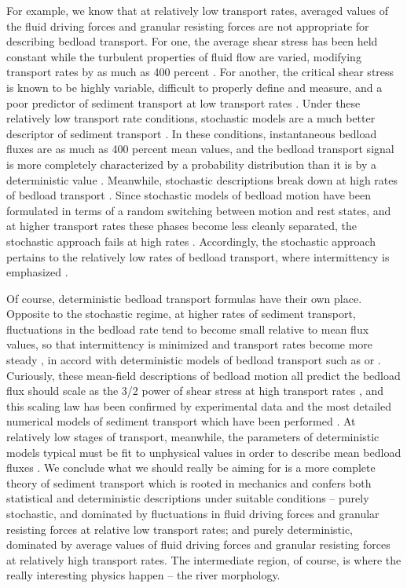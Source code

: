 \documentclass{article}
\begin{document}
For example, we know that at relatively low transport rates, averaged values of the fluid driving forces and granular resisting forces are not appropriate for describing bedload transport. 
For one, the average shear stress has been held constant while the turbulent properties of fluid flow are varied, modifying transport rates by as much as 400 percent \citep{Sumer2003}. 
For another, the critical shear stress is known to be highly variable, difficult to properly define and measure, and a poor predictor of sediment transport at low transport rates \citep{Paintal1969, Kirchener1990, Montgomery1997, Wilcock2008}. 
Under these relatively low transport rate conditions, stochastic models are a much better descriptor of sediment transport \citep{Yalin1972, Ancey2006, Furbish2012}. 
In these conditions, instantaneous bedload fluxes are as much as 400 percent mean values, and the bedload transport signal is more completely characterized by a probability distribution than it is by a deterministic value \citep{Bohm2004, Singh2009}. 
Meanwhile, stochastic descriptions break down at high rates of bedload transport \citep{Yalin1972}. 
Since stochastic models of bedload motion have been formulated in terms of a random switching between motion and rest states, and at higher transport rates these phases become less cleanly separated, the stochastic approach fails at high rates \citep{Heyman2013}.
Accordingly, the stochastic approach pertains to the relatively low rates of bedload transport, where intermittency is emphasized \citep{Ancey2008}.  

Of course, deterministic bedload transport formulas have their own place. 
Opposite to the stochastic regime, at higher rates of sediment transport, fluctuations in the bedload rate tend to become small relative to mean flux values, so that intermittency is minimized and transport rates become more steady \citep{Ancey2008}, in accord with deterministic models of bedload transport such as \citet{Meyer-Peter1948} or \citet{Bagnold1966}.  
Curiously, these mean-field descriptions of bedload motion all predict the bedload flux should scale as the 3/2 power of shear stress at high transport rates \citep{Yalin1972}, and this scaling law has been confirmed by experimental data \citep{Gomez1989, Recking2007, Wong2007} and the most detailed numerical models of sediment transport which have been performed \citep{Elghannay2017}. 
At relatively low stages of transport, meanwhile, the parameters of deterministic models typical must be fit to unphysical values in order to describe mean bedload fluxes \citep{}. 
We conclude what we should really be aiming for is a more complete theory of sediment transport which is rooted in mechanics and confers both statistical and deterministic descriptions under suitable conditions -- purely stochastic, and dominated by fluctuations in fluid driving forces and granular resisting forces at relative low transport rates; and purely deterministic, dominated by average values of fluid driving forces and granular resisting forces at relatively high transport rates. 
The intermediate region, of course, is where the really interesting physics happen -- the river morphology. 
\end{document}
